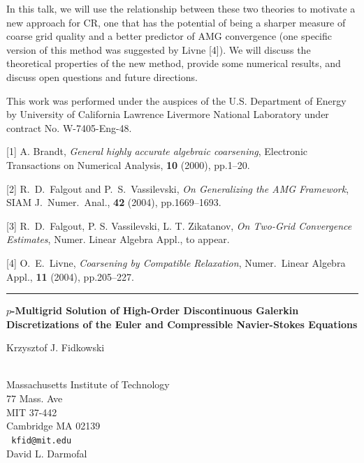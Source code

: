 \documentclass[twosided]{report}
\begin{document}
In this talk, we will use the relationship between these two theories
to motivate a new approach for CR, one that has the potential of being
a sharper measure of coarse grid quality and a better predictor of AMG
convergence (one specific version of this method was suggested by Livne
[4]). We will discuss the theoretical properties of the new method,
provide some numerical results, and discuss open questions and future
directions.

This work was performed under the auspices of the U.S. Department of
Energy by University of California Lawrence Livermore National
Laboratory under contract No. W-7405-Eng-48.

[1] A. Brandt,
{\em General highly accurate algebraic coarsening}, Electronic
Transactions on Numerical Analysis, {\bf 10} (2000), pp.1--20.

[2] R.~D.~Falgout and P.~S.~Vassilevski, {\em On Generalizing the AMG
Framework}, SIAM J.~Numer.~Anal., {\bf 42} (2004), pp.1669--1693.

[3] R.~D.~Falgout, P. S. Vassilevski, L. T. Zikatanov,
{\em On Two-Grid Convergence Estimates},
Numer. Linear Algebra Appl., to appear.

[4] O.~E.~Livne,
{\em Coarsening by Compatible Relaxation},
Numer.~Linear Algebra Appl., {\bf 11} (2004), pp.205--227.

\begin{center}

\rule{6in}{1pt}
\end{center}

\begin{center}
{\large			\label{fidkowski}
{\bf
$p$-Multigrid Solution of High-Order Discontinuous Galerkin
Discretizations of the Euler and Compressible Navier-Stokes Equations
}

Krzysztof J. Fidkowski} \\
Massachusetts Institute of Technology \\
77 Mass. Ave \\
MIT 37-442 \\
Cambridge MA 02139
\\ {\tt
kfid@mit.edu
}
\\
David L. Darmofal
\end{center}
\end{document}
